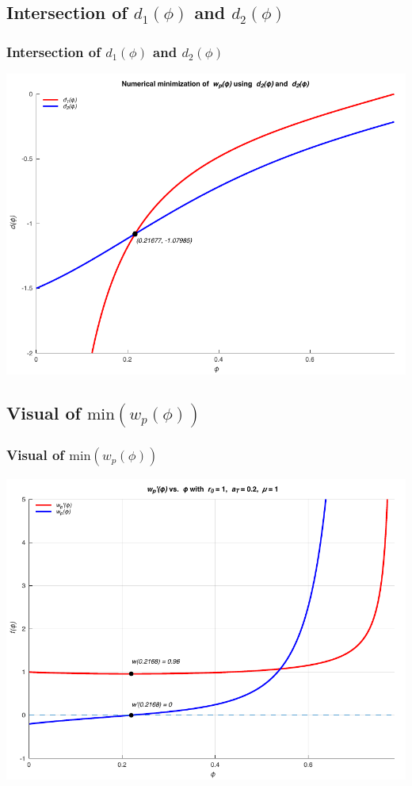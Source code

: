 \documentclass{beamer}
\newcommand{\sectit}[1]{
    \section{\texorpdfstring{#1}{}}
    \frametitle{#1}
}
\begin{document}
\begin{frame}
    \sectit{Intersection of $d_1(\phi)$ and $d_2(\phi)$}

    \begin{center}
        \includegraphics[scale=0.7]{plots/partC_min.pdf}
    \end{center}
\end{frame}

\begin{frame}
    \sectit{Visual of $\text{min}(w_p(\phi))$}

    \begin{center}
        \includegraphics[scale=0.7]{plots/partC_r.pdf}
    \end{center}
\end{frame}
\end{document}
